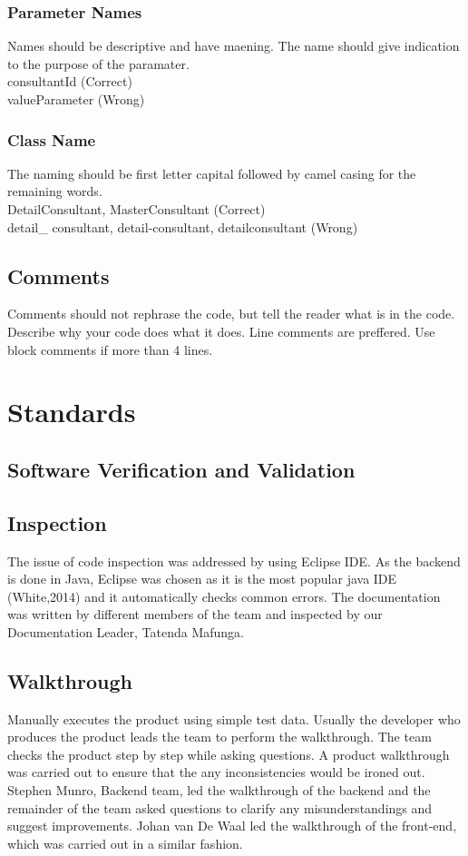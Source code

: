 \documentclass[a4paper,12pt]{report}
\begin{document}
	\subsubsection{Parameter Names}
		Names should be descriptive and have maening. The name should give indication to the 		purpose of the paramater.\\
		\indent consultantId (Correct)\\
		\indent valueParameter (Wrong)


\subsubsection{Class Name}
		The naming should be first letter capital followed by camel casing for the remaining words.\\
		 \indent DetailConsultant, MasterConsultant  (Correct)\\
		\indent detail\_ consultant, detail-consultant, detailconsultant (Wrong)\\
		
\subsection{Comments}
		Comments should not rephrase the code, but tell the reader what is in the code. Describe why your code does what it does.  Line comments are preffered. Use block comments if more than 4 lines.


		

\section{Standards}
\subsection{Software Verification and Validation}
\subsection{Inspection}
The issue of code inspection was addressed by using Eclipse IDE. As the backend is done in Java, Eclipse was chosen as it is the most popular java IDE (White,2014) and it automatically checks common errors. The documentation was written by different members of the team and inspected by our Documentation Leader, Tatenda Mafunga.\\
\subsection{Walkthrough}
Manually executes the product using simple test data. Usually the developer who produces the product leads the team to perform the walkthrough. The team checks the product step by step while asking questions. A product walkthrough was carried out to ensure that the any inconsistencies would be ironed out. Stephen Munro, Backend team, led the walkthrough of the backend and the remainder of the team asked questions to clarify any misunderstandings and suggest improvements. Johan van De Waal led the walkthrough of the front-end, which was carried out in a similar fashion.\\
\end{document}
